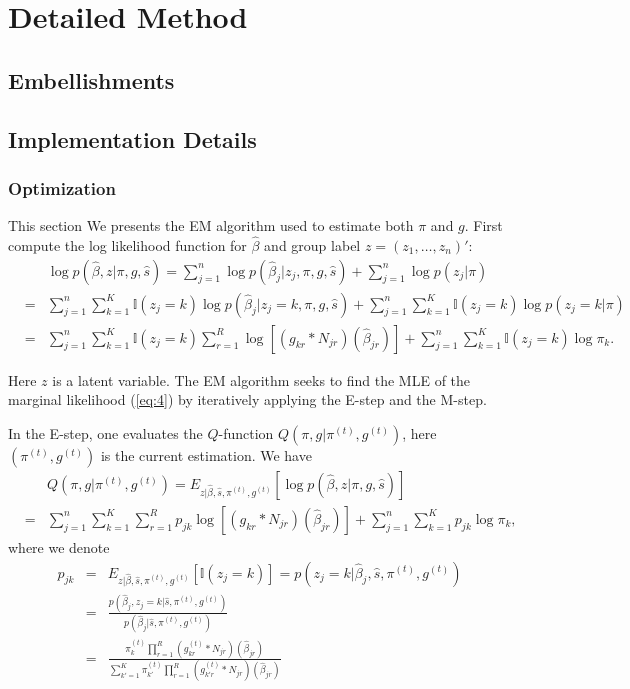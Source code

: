 \documentclass[11pt]{article}
\begin{document}
\section{Detailed Method}

\subsection{Embellishments}

\subsection{Implementation Details} \label{sec:detail}

\subsubsection{Optimization}
This section We presents the EM algorithm used to estimate both $\pi$ and $g$. First compute the log likelihood function for $\hat\beta$ and group label $z=(z_1,\ldots,z_n)'$:
\begin{eqnarray}
    &&\log p(\hat\beta,z|\pi,g,\hat s) = \sum_{j=1}^n\log p(\hat\beta_j|z_j,\pi,g,\hat s)+\sum_{j=1}^n\log p(z_j|\pi) \nonumber\\
    &=& \sum_{j=1}^n\sum_{k=1}^K\mathbb{I}(z_j=k)\log p(\hat\beta_j|z_j=k,\pi,g,\hat s)
    +\sum_{j=1}^n\sum_{k=1}^K\mathbb{I}(z_j=k)\log p(z_j=k|\pi)\nonumber\\
    &=& \sum_{j=1}^n\sum_{k=1}^K\mathbb{I}(z_j=k)\sum_{r=1}^R\log \left[(g_{kr}*N_{jr})(\hat\beta_{jr}) \right]+\sum_{j=1}^n\sum_{k=1}^K\mathbb{I}(z_j=k)\log\pi_k.
\end{eqnarray}

Here $z$ is a latent variable. The EM algorithm seeks to find the MLE of the marginal likelihood (\ref{eq:4}) by iteratively applying the E-step and the M-step.

In the E-step, one evaluates the $Q$-function $Q(\pi,g|\pi^{(t)},g^{(t)})$, here $(\pi^{(t)},g^{(t)})$ is the current estimation. We have
\begin{eqnarray}
    &&Q(\pi,g|\pi^{(t)},g^{(t)}) = E_{z|\hat\beta,\hat s,\pi^{(t)},g^{(t)}}\left[\log p(\hat\beta,z|\pi,g,\hat s)\right]\nonumber\\
    &=&\sum_{j=1}^n\sum_{k=1}^K\sum_{r=1}^Rp_{jk}\log \left[(g_{kr}*N_{jr})(\hat\beta_{jr}) \right]+\sum_{j=1}^n\sum_{k=1}^Kp_{jk}\log\pi_k,
\label{eq:Q}
\end{eqnarray}
where we denote
\begin{eqnarray}
    p_{jk}&=&E_{z|\hat\beta,\hat s,\pi^{(t)},g^{(t)}}[\mathbb{I}(z_j=k)]=p(z_j=k|\hat\beta_j,\hat s,\pi^{(t)},g^{(t)})\nonumber\\
    &=& \frac{p(\hat\beta_j,z_j=k|\hat s,\pi^{(t)},g^{(t)})}{p(\hat\beta_j|\hat s,\pi^{(t)},g^{(t)})}\nonumber\\
    &=& \frac{\pi_k^{(t)}\prod_{r=1}^R(g_{kr}^{(t)}*N_{jr})(\hat\beta_{jr})}{\sum_{k'=1}^K\pi_{k'}^{(t)}\prod_{r=1}^R(g_{k'r}^{(t)}*N_{jr})(\hat\beta_{jr})}
\end{eqnarray}
\end{document}
